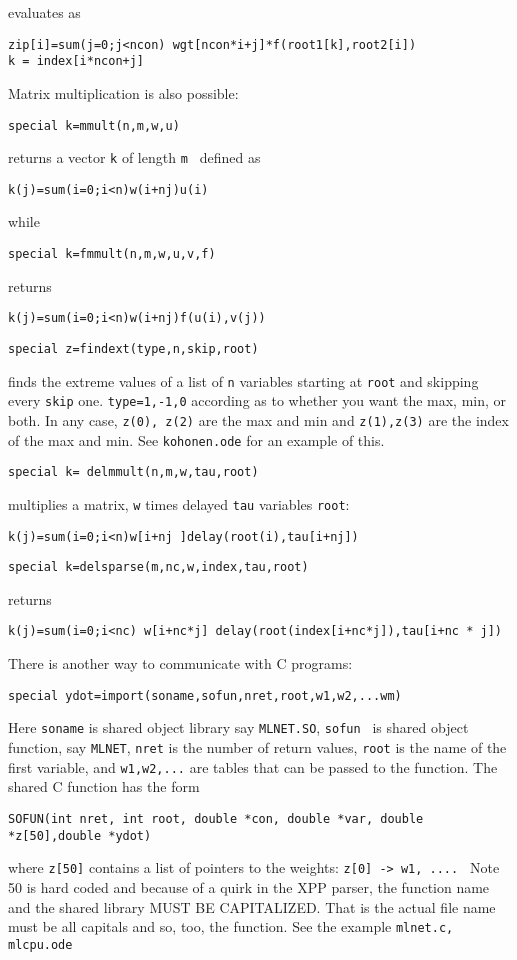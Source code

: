 evaluates as 
\begin{verbatim}
zip[i]=sum(j=0;j<ncon) wgt[ncon*i+j]*f(root1[k],root2[i])
k = index[i*ncon+j] 
\end{verbatim}
Matrix multiplication is also possible:
\begin{verbatim}
special k=mmult(n,m,w,u)
\end{verbatim}
returns a vector {\tt k}  of length {\tt m } defined as
\begin{verbatim}
k(j)=sum(i=0;i<n)w(i+nj)u(i)
\end{verbatim}
while
 \begin{verbatim}
special k=fmmult(n,m,w,u,v,f)
\end{verbatim} 
returns
\begin{verbatim}
k(j)=sum(i=0;i<n)w(i+nj)f(u(i),v(j))
\end{verbatim}

\begin{verbatim}
special z=findext(type,n,skip,root)
\end{verbatim}
finds the extreme values of a list of {\tt n} variables starting at {\tt root} and skipping every {\tt skip} one.  {\tt type=1,-1,0} according as to whether you want the max, min, or both. In any case, {\tt z(0), z(2)} are the max and min and {\tt z(1),z(3)} are the index of the max and min.  See {\tt kohonen.ode} for an example of this.  
\begin{verbatim}
special k= delmmult(n,m,w,tau,root)
\end{verbatim}
multiplies a matrix, {\tt w} times delayed {\tt tau} variables {\tt root}:
\begin{verbatim}
k(j)=sum(i=0;i<n)w[i+nj ]delay(root(i),tau[i+nj])
\end{verbatim}
\begin{verbatim}
special k=delsparse(m,nc,w,index,tau,root)
\end{verbatim}
returns
\begin{verbatim}
k(j)=sum(i=0;i<nc) w[i+nc*j] delay(root(index[i+nc*j]),tau[i+nc * j])
\end{verbatim}
There is another way to communicate with C programs:
\begin{verbatim}     
special ydot=import(soname,sofun,nret,root,w1,w2,...wm)
\end{verbatim}  
Here {\tt soname}  is shared object library say {\tt MLNET.SO}, 
{\tt sofun }  is shared object function, say {\tt MLNET},  
 {\tt nret} is the number of return values,
 {\tt root} is the name of the first variable, and {\tt w1,w2,...} are tables that can be passed to the function.
The shared C function has the form
\begin{verbatim}
SOFUN(int nret, int root, double *con, double *var, double *z[50],double *ydot)
\end{verbatim}
where {\tt *z[50]}  contains a list of pointers to the weights: {\tt  z[0] -> w1, .... }  Note 50 is hard coded and because of a quirk in the XPP parser, the function name and the shared library MUST BE CAPITALIZED. That is the actual file name must be all capitals and so, too, the function. See the example {\tt mlnet.c, mlcpu.ode} 
 

